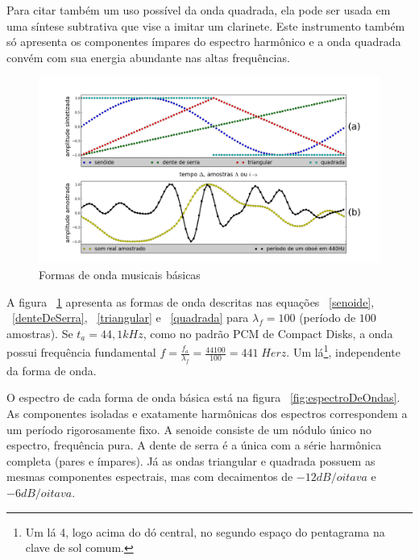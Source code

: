 Para citar também um uso possível da onda quadrada, ela pode ser usada em uma síntese
subtrativa que vise a imitar um clarinete. Este instrumento também só apresenta os
componentes ímpares do espectro harmônico e a onda quadrada convém com sua energia abundante nas altas frequências.



\begin{figure}[h!]
    \centering
        \includegraphics[width=\textwidth]{figuras/formasDeOnda6}
    \caption{Formas de onda musicais básicas}
        \label{fig:formasDeOnda}
\end{figure}



A figura ~\ref{fig:formasDeOnda} apresenta
as formas de onda descritas nas equações ~\ref{senoide}, ~\ref{denteDeSerra}, ~\ref{triangular} e ~\ref{quadrada} para $\lambda_f=100$ (período
de $100$ amostras).
Se $t_a=44,1 kHz$, como no padrão PCM de Compact Disks, a onda possui frequência fundamental $f=\frac{f_a}{\lambda_f}=\frac{44100}{100} = 441 \; Herz $. Um lá\footnote{Um lá 4, logo acima do dó central, no segundo espaço do pentagrama na clave de sol comum.}, independente da forma de onda.

O espectro de cada forma de onda básica está na figura ~\ref{fig:espectroDeOndas}. As componentes isoladas e exatamente harmônicas dos espectros correspondem a um período rigorosamente fixo. A senoide consiste de um nódulo único no espectro, frequência pura. A dente de serra é a única com a série harmônica completa (pares e ímpares). Já as ondas triangular e quadrada possuem as mesmas componentes espectrais, mas com decaimentos de $-12dB/oitava$ e $-6dB/oitava$.

